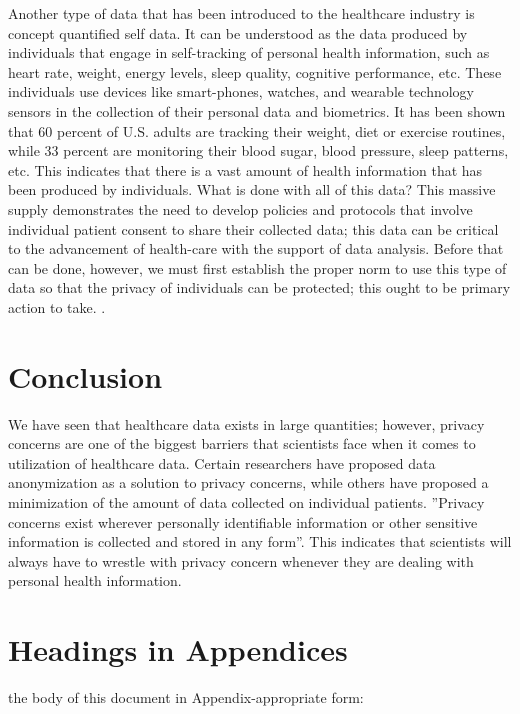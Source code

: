 \documentclass[sigconf]{acmart}
\begin{document}
Another type of data that has been introduced to the healthcare industry is concept quantified self data. It can be understood as the data produced by individuals that engage in self-tracking of personal health information, such as heart rate, weight, energy levels, sleep quality, cognitive performance, etc. These individuals use devices like smart-phones, watches, and wearable technology sensors in the collection of their personal data and biometrics. It has been shown that 60 percent of U.S. adults are tracking their weight, diet or exercise routines, while 33 percent are monitoring their blood sugar, blood pressure, sleep patterns, etc. This indicates that there is a vast amount of health information that has been produced by individuals. What is done with all of this data? This massive supply demonstrates the need to develop policies and protocols that involve individual patient consent to share their collected data; this data can be critical to the advancement of health-care with the support of data analysis. Before that can be done, however, we must first establish the proper norm to use this type of data so that the privacy of individuals can be protected; this ought to be primary action to take. \cite{swan2013quantified}.

\section{Conclusion}

We have seen that healthcare data exists in large quantities; however, privacy concerns are one of the biggest barriers that scientists face when it comes to utilization of healthcare data. Certain researchers have proposed data anonymization as a solution to privacy concerns, while others have proposed a minimization of the amount of data collected on individual patients. ''Privacy concerns exist wherever personally identifiable information or other sensitive information is collected and stored in any form''\cite{khan2014big}. This indicates that scientists will always have to wrestle with privacy concern whenever they are dealing with personal health information.  

\appendix

\section{Headings in Appendices}

the body of this document in Appendix-appropriate form:
\end{document}
